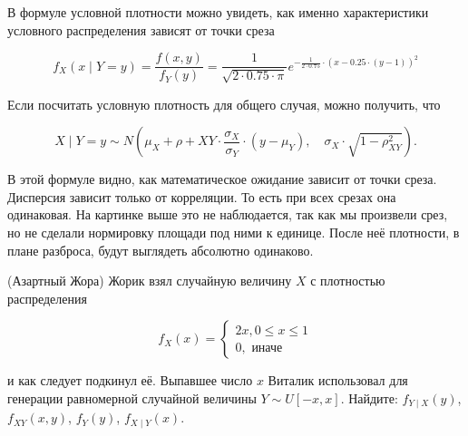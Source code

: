 \documentclass[12pt, a4paper, oneside]{article}
\begin{document}
В формуле условной плотности можно увидеть, как именно характеристики условного распределения зависят от точки среза

\[
f_X(x \mid Y = y)  = \frac{f(x,y)}{f_Y(y)} = \frac{1}{\sqrt{2 \cdot 0.75 \cdot \pi}} e^{-\frac{1}{2 \cdot 0.75} \cdot(x - 0.25 \cdot(y-1))^2}
\]

Если посчитать условную плотность для общего случая, можно получить, что 

\[ X \mid Y=y \sim N \left(\mu_X + \rho+{XY} \cdot \frac{\sigma_X}{\sigma_Y} \cdot(y - \mu_Y), \quad \sigma_X \cdot \sqrt{1- \rho_{XY}^2} \right).\]

В этой формуле видно, как математическое ожидание зависит от точки среза. Дисперсия зависит только от корреляции. То есть при всех срезах она одинаковая. На картинке выше это не наблюдается, так как мы произвели срез, но не сделали нормировку площади под ними к единице. После неё плотности, в плане разброса, будут выглядеть абсолютно одинаково. 


\begin{problem}{(Азартный Жора)}
Жорик взял случайную величину $X$  с плотностью распределения 

\[ 
f_X(x) = \begin{cases} 2x,  0 \le x \le 1 \\ 0, \text{ иначе} \end{cases}
\]	 

и как следует подкинул её. Выпавшее число  $x$ Виталик использовал для генерации равномерной случайной величины $Y \sim U[-x, x]$. Найдите: $f_{Y \mid X} (y)$,   $f_{XY}(x,y)$,  $f_Y(y)$,  $f_{X \mid Y} (x)$.
\end{problem}
\end{document}
